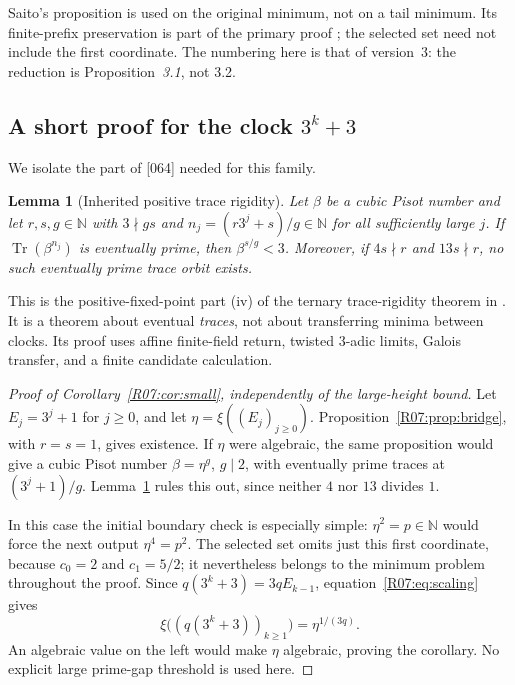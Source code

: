 \documentclass[11pt,a4paper]{article}
\newtheorem{lemma}[theorem]{Lemma}\newtheorem{proposition}[theorem]{Proposition}
\theoremstyle{definition}\newtheorem{definition}[theorem]{Definition}
\theoremstyle{remark}\newtheorem{remark}[theorem]{Remark}
\newcommand{\N}{\mathbb N}\newcommand{\Z}{\mathbb Z}\newcommand{\Q}{\mathbb Q}
\DeclareMathOperator{\Tr}{Tr}\DeclareMathOperator{\tr}{tr}\DeclareMathOperator{\Nm}{N}
\begin{document}
Saito's proposition is used on the original minimum, not on a tail
minimum. Its finite-prefix preservation is part of the primary proof
\cite[Lemma~5.2, equations (5.5)--(5.14)]{Saito}; the selected set need
not include the first coordinate. The numbering here is that of
version~3: the reduction is Proposition~\emph{3.1}, not 3.2.

\subsection{A short proof for the clock \texorpdfstring{$3^k+3$}{3\string^k+3}}

We isolate the part of [064] needed for this family.

\begin{lemma}[Inherited positive trace rigidity]\label{R07:lem:rigidity}
Let $\beta$ be a cubic Pisot number and let $r,s,g\in\N$ with
$3\nmid gs$ and $n_j=(r3^j+s)/g\in\N$ for all sufficiently large $j$.
If $\Tr(\beta^{n_j})$ is eventually prime, then
$\beta^{s/g}<3$. Moreover, if $4s\nmid r$ and $13s\nmid r$,
no such eventually prime trace orbit exists.
\end{lemma}

This is the positive-fixed-point part (iv) of the ternary trace-rigidity
theorem in \cite{K064}. It is a theorem about eventual \emph{traces},
not about transferring minima between clocks. Its proof uses affine
finite-field return, twisted $3$-adic limits, Galois transfer, and a
finite candidate calculation.

\begin{proof}[Proof of Corollary~\ref{R07:cor:small}, independently of the large-height bound]
Let $E_j=3^j+1$ for $j\ge0$, and let $\eta=\xi((E_j)_{j\ge0})$.
Proposition~\ref{R07:prop:bridge}, with $r=s=1$, gives existence.
If $\eta$ were algebraic, the same proposition would give a cubic
Pisot number $\beta=\eta^g$, $g\mid2$, with eventually prime traces
at $(3^j+1)/g$. Lemma~\ref{R07:lem:rigidity} rules this out, since neither
$4$ nor $13$ divides $1$.

In this case the initial boundary check is especially simple:
$\eta^2=p\in\N$ would force the next output $\eta^4=p^2$.
The selected set omits just this first coordinate, because
$c_0=2$ and $c_1=5/2$; it nevertheless belongs to the minimum problem
throughout the proof.
Since $q(3^k+3)=3qE_{k-1}$, equation~\eqref{R07:eq:scaling} gives
\[
              \xi\bigl((q(3^k+3))_{k\ge1}\bigr)=\eta^{1/(3q)}.
\]
An algebraic value on the left would make $\eta$ algebraic, proving
the corollary. No explicit large prime-gap threshold is used here.
\end{proof}
\end{document}

